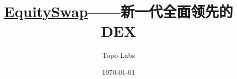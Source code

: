 \documentclass{article}
\title{\href{https://equityswap.club/swap}{EquitySwap}——新一代全面领先的DEX}
\author{Topo Labs}
\date{\today}
\begin{document}
\maketitle

\begin{comment}

Goals: 
* Introduce the problems we are solving in web3
* Introduce our approach and our solutions to reliability, scalability, and upgradeability while preserving decentralization
* Differentiate our approach from others in the web3 space
Provide the appropriate level of detail - especially for future work (more detail on areas we have more information and more directional on areas we still need to do research/eng)

Terminology:
* Nodes - full nodes or validators
* Uppercase Internet
* Aptos blockchain - do not use Aptos protocol
* up-to-date, not up to date
* Ledger state and ledger history
* Avoid the word database in the context of blockchain
* trade-offs not tradeoff
* upgradeable, not upgradable
* web3, not Web3 unless at the beginning of a sentence.
* dApp is out-of-date, just applications are fine.
* high throughput not high-throughput

Formatting:
* After end{itemize} or end{enumerate}, start the next sentence immediately so the indent is far to the left instead of indented

\end{comment}

\renewcommand{\abstractname}{Abstract}
\renewcommand{\figurename}{图}
\end{document}

